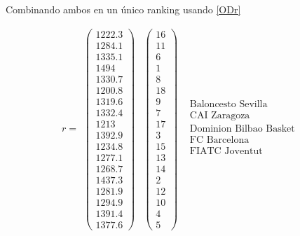	Combinando ambos en un único ranking usando \ref{ODr}
	
		\[r=
		\begin{array}{ccc}
		\left(\begin{array}{c}
		    1222.3\\
		    1284.1\\
		    1335.1\\
		    1494\\
		    1330.7\\
		    1200.8\\
		    1319.6\\
		    1332.4\\
		    1213\\
		    1392.9\\
		    1234.8\\
		    1277.1\\
		    1268.7\\
		    1437.3\\
		    1281.9\\
		    1294.9\\
		    1391.4\\
		    1377.6
		\end{array} \right) & \left(\begin{array}{c}
		    16\\
		    11\\
		    6\\
		    1\\
		    8\\
		    18\\
		    9\\
		    7\\
		    17\\
		    3\\
		    15\\
		    13\\
		    14\\
		    2\\
		    12\\
		    10\\
		    4\\
		    5
		\end{array} \right) & \begin{array}{c}
		\text{Baloncesto Sevilla}\\
		\text{CAI Zaragoza} \\
		\text{Dominion Bilbao Basket} \\
		\text{FC Barcelona} \\
		\text{FIATC Joventut} \\

\end{array}
\end{array}\]
